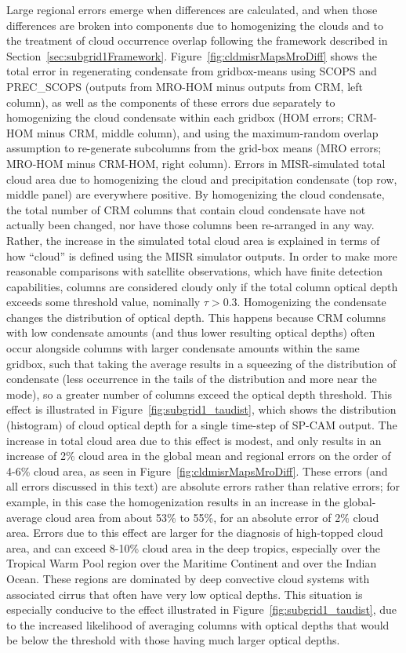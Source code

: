 Large regional errors emerge when differences are calculated, and when
those differences are broken into components due to homogenizing the
clouds and to the treatment of cloud occurrence overlap following the
framework described in Section~\ref{sec:subgrid1Framework}.
Figure~\ref{fig:cldmisrMapsMroDiff} shows the total error in
regenerating condensate from gridbox-means using SCOPS and PREC\_SCOPS
(outputs from MRO-HOM minus outputs from CRM, left column), as well as
the components of these errors due separately to homogenizing the cloud
condensate within each gridbox (HOM errors; CRM-HOM minus CRM, middle
column), and using the maximum-random overlap assumption to re-generate
subcolumns from the grid-box means (MRO errors; MRO-HOM minus CRM-HOM,
right column). Errors in MISR-simulated total cloud area due to
homogenizing the cloud and precipitation condensate (top row, middle
panel) are everywhere positive. By homogenizing the cloud condensate,
the total number of CRM columns that contain cloud condensate have not
actually been changed, nor have those columns been re-arranged in any
way. Rather, the increase in the simulated total cloud area is explained
in terms of how ``cloud'' is defined using the MISR simulator outputs.
In order to make more reasonable comparisons with satellite
observations, which have finite detection capabilities, columns are
considered cloudy only if the total column optical depth exceeds some
threshold value, nominally \(\tau > 0.3\). Homogenizing the condensate
changes the distribution of optical depth. This happens because CRM
columns with low condensate amounts (and thus lower resulting optical
depths) often occur alongside columns with larger condensate amounts
within the same gridbox, such that taking the average results in a
squeezing of the distribution of condensate (less occurrence in the
tails of the distribution and more near the mode), so a greater number
of columns exceed the optical depth threshold. This effect is
illustrated in Figure~\ref{fig:subgrid1_taudist}, which shows the
distribution (histogram) of cloud optical depth for a single time-step
of SP-CAM output. The increase in total cloud area due to this effect is
modest, and only results in an increase of 2\% cloud area in the global
mean and regional errors on the order of 4-6\% cloud area, as seen in
Figure~\ref{fig:cldmisrMapsMroDiff}. These errors (and all errors
discussed in this text) are absolute errors rather than relative errors;
for example, in this case the homogenization results in an increase in
the global-average cloud area from about 53\% to 55\%, for an absolute
error of 2\% cloud area. Errors due to this effect are larger for the
diagnosis of high-topped cloud area, and can exceed 8-10\% cloud area in
the deep tropics, especially over the Tropical Warm Pool region over the
Maritime Continent and over the Indian Ocean. These regions are
dominated by deep convective cloud systems with associated cirrus that
often have very low optical depths. This situation is especially
conducive to the effect illustrated in
Figure~\ref{fig:subgrid1_taudist}, due to the increased likelihood of
averaging columns with optical depths that would be below the threshold
with those having much larger optical depths.

